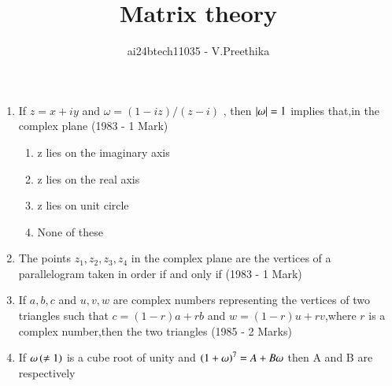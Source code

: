 \documentclass[journal,12pt,twocolumn]{IEEEtran}
\theoremstyle{remark}
\begin{document}

\vspace{3cm}

\title{Matrix theory}
\author{ai24btech11035 - V.Preethika}
\maketitle
\newpage
\bigskip

\renewcommand{\thefigure}{\theenumi}
\renewcommand{\thetable}{\theenumi}

\begin{enumerate}[start=6]
\item If $z=x+iy$ and $\omega=(1-iz)/(z-i)$ , then $\left\vert\omega\right\vert=1$ implies that,in the complex plane
\hfill{(1983 - 1 Mark)}
\begin{enumerate}
\item z lies on the imaginary axis
\item z lies on the real axis
\item z lies on unit circle
\item None of these
\end{enumerate}
\item The points $z_1,z_2,z_3,z_4$ in the complex plane are the vertices of a parallelogram taken in order if and only if
\hfill{(1983 - 1 Mark)}
\begin{enumerate}
\end{enumerate}
\item If $a,b,c$ and $u,v,w$ are complex numbers representing the vertices of two triangles such that $c=(1-r)a+rb$ and $w=(1-r)u+rv$,where $r$ is a complex number,then the two triangles
\hfill{(1985 - 2 Marks)}
\begin{enumerate}
\end{enumerate}
\item If $\omega\left(\neq1\right)$ is a cube root of unity and $\left(1+\omega\right)^7=A+B\omega$ then A and B are respectively

\end{enumerate}
\end{document}
